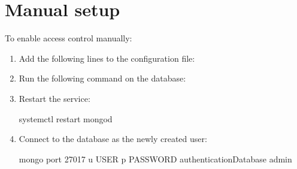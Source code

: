 \documentclass[letterpaper,10pt,english]{sphinxmanual}
\begin{document}
\section{Manual setup}
\label{\detokenize{enable-auth:manual-setup}}
\sphinxAtStartPar
To enable access control manually:
\begin{enumerate}
%
\item {} 
\sphinxAtStartPar
Add the following lines to the configuration file:

\begin{sphinxVerbatim}[commandchars=\\\{\}]
   
\end{sphinxVerbatim}

\item {} 
\sphinxAtStartPar
Run the following command on the  database:

\begin{sphinxVerbatim}[commandchars=\\\{\}]
      \PYG{p}{[}\PYG{p}{]} 
\end{sphinxVerbatim}

\item {} 
\sphinxAtStartPar
Restart the  service:

\begin{sphinxVerbatim}[commandchars=\\\{\}]
\PYGZdl{} systemctl restart mongod
\end{sphinxVerbatim}

\item {} 
\sphinxAtStartPar
Connect to the database as the newly created user:

\begin{sphinxVerbatim}[commandchars=\\\{\}]
\PYGZdl{} mongo \PYGZhy{}\PYGZhy{}port 27017 \PYGZhy{}u \PYGZsq{}USER\PYGZsq{} \PYGZhy{}p \PYGZsq{}PASSWORD\PYGZsq{}  \PYGZhy{}\PYGZhy{}authenticationDatabase \PYGZdq{}admin\PYGZdq{}
\end{sphinxVerbatim}

\end{enumerate}
\end{document}
